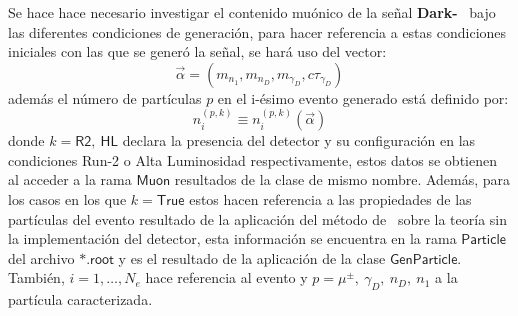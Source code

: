 
Se hace hace necesario investigar el contenido muónico de la señal \textbf{Dark-}\SUSY~ bajo las diferentes condiciones de generación, para hacer referencia a estas condiciones iniciales con las que se generó la señal, se hará uso del vector:
\begin{equation}
\vec{\alpha} = (m_{n_1}, m_{n_D}, m_{\gamma_D}, c\tau_{\gamma_D})
\end{equation}
además el número de partículas $p$ en el i-ésimo evento generado está definido por:
\begin{equation}\label{numero_particulas}
n_i^{(p,k)} \equiv n_i^{(p,k)} (\vec{\alpha})
\end{equation}
donde 
$k =\textsf{R2},~\textsf{HL}$ declara la presencia del detector y su configuración en las condiciones Run-2 o Alta Luminosidad respectivamente, estos datos se obtienen al acceder a la rama $\textsf{Muon}$ resultados de la clase de mismo nombre. Además, para los casos en los que $k=\textsf{True}$ estos hacen referencia a las propiedades de las partículas del evento resultado de la aplicación del método de \MC ~sobre la teoría sin la implementación del detector, esta información se encuentra en la rama $\textsf{Particle}$ del archivo $\textsf{*.root}$ y es el resultado de la aplicación de la clase $\textsf{GenParticle}$. También, $i = 1, \ldots, N_{e}$ hace referencia al evento y $p = \mu^\pm, ~ \gamma_D, ~n_D, ~n_1$ a la partícula caracterizada.

